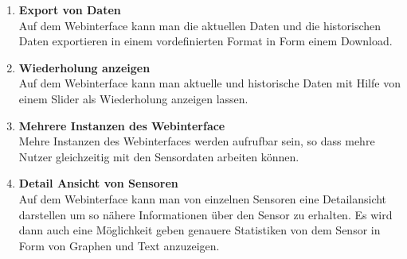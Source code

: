 \begin{enumerate}[label=\textbf{PF\arabic{enumi}0}]
	\item \textbf{Export von Daten}\\
		Auf dem Webinterface kann man die aktuellen Daten und die historischen Daten exportieren in einem vordefinierten Format in Form einem Download. 
		
	\item \textbf{Wiederholung anzeigen}\\
		Auf dem Webinterface kann man aktuelle und historische Daten mit Hilfe von einem Slider als Wiederholung anzeigen lassen.
		
	\item \textbf{Mehrere Instanzen des Webinterface}\\
		Mehre Instanzen des Webinterfaces werden aufrufbar sein, so dass mehre Nutzer gleichzeitig mit den Sensordaten arbeiten können.
		
	\item \textbf{Detail Ansicht von Sensoren}\\
		Auf dem Webinterface kann man von einzelnen Sensoren eine Detailansicht darstellen um so nähere Informationen über den Sensor zu erhalten. Es wird dann auch eine Möglichkeit geben genauere Statistiken von dem Sensor in Form von Graphen und Text anzuzeigen.
	
		
	 
	  
\end{enumerate}
